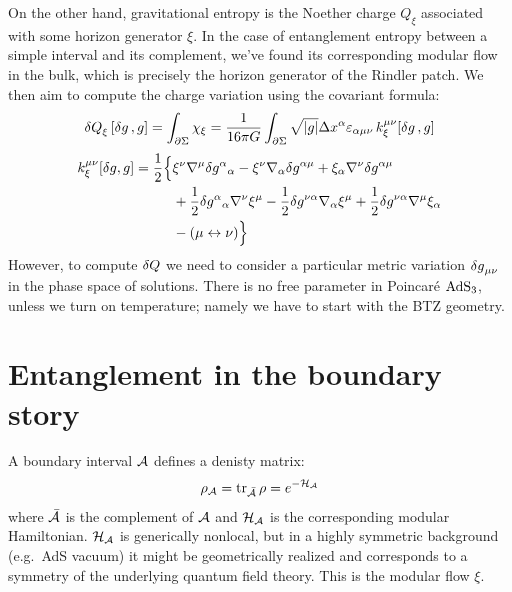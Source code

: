 \documentclass[11pt,a4paper]{article}
\begin{document}
	On the other hand, gravitational entropy is the Noether charge $Q_\xi$ associated with some horizon generator $\xi$. In the case of entanglement entropy between a simple interval and its complement, we've found its corresponding modular flow in the bulk, which is precisely the horizon generator of the Rindler patch. We then aim to compute the charge variation using the covariant formula:
	\begin{equation}
		\var{Q}_{\xi} [\var{g}, g]
		= \int_{\partial\Sigma}
			\chi_\xi
		= \frac{1}{16 \pi G}
			\int_{\partial\Sigma}
			\sqrt{|g|} \Delta{x}^{\alpha}
				\varepsilon_{\alpha\mu\nu}\,
				k_\xi^{\mu\nu} [\var{g}, g]
	\end{equation}
	\begin{equation}
	\begin{aligned}
		k_\xi^{\mu\nu}[\var g, g]
		= \frac{1}{2} \Big \{
		& \xi^{\nu}\nabla^{\mu} \var g^{\alpha}{}_{\alpha}
		- \xi^{\nu} \nabla_{\alpha} \var g^{\alpha\mu}
		+ \xi_{\alpha} \nabla^{\nu} \var g^{\alpha\mu}  \\
		&+ \frac{1}{2} \var g^{\alpha}{}_{\alpha} \nabla^{\nu} \xi^{\mu}
		- \frac{1}{2} \var g^{\nu\alpha} \nabla_{\alpha}\xi^{\mu}
		+ \frac{1}{2} \var g^{\nu\alpha} \nabla^{\mu} \xi_{\alpha} \\
		&- (\mu \leftrightarrow \nu) \Big \}
	\end{aligned}
	\label{kdef}
	\end{equation}
	However, to compute $\var{Q}$ we need to consider a particular metric variation $\var{g}_{\mu\nu}$ in the phase space of solutions. There is no free parameter in Poincar\'e $\mathrm{AdS}_3$, unless we turn on temperature; namely we have to start with the BTZ geometry. 

\section{Entanglement in the boundary story}
	A boundary interval $\mathcal{A}$ defines a denisty matrix:
	\begin{equation}
		\rho_{\mathcal{A}}
		= \operatorname{tr}_{\bar{\mathcal{A}}} \rho
		= e^{-\mathcal{H}_{\mathcal{A}}}
	\end{equation}
	where $\bar{\mathcal{A}}$ is the complement of $\mathcal{A}$ and $\mathcal{H}_{\mathcal{A}}$ is the corresponding modular Hamiltonian. $\mathcal{H}_{\mathcal{A}}$ is generically nonlocal, but in a highly symmetric background (e.g.~AdS vacuum) it might be geometrically realized and corresponds to a symmetry of the underlying quantum field theory. This is the modular flow $\xi$. 
	
\end{document}
